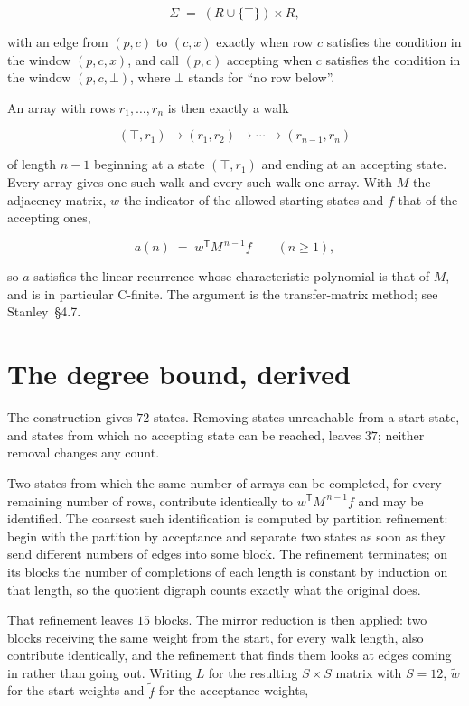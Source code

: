 \documentclass[11pt]{article}
\theoremstyle{definition}
\begin{document}
\[\Sigma \;=\; (R \cup \{\top\}) \times R,\]

with an edge from $(p,c)$ to $(c,x)$ exactly when row $c$ satisfies the condition in the window $(p,c,x)$, and call $(p,c)$ accepting when $c$ satisfies the condition in the window $(p,c,\bot)$, where $\bot$ stands for ``no row below''.

An array with rows $r_1,\dots,r_n$ is then exactly a walk

\[(\top,r_1) \to (r_1,r_2) \to \cdots \to (r_{n-1},r_n)\]

of length $n-1$ beginning at a state $(\top,r_1)$ and ending at an accepting state. Every array gives one such walk and every such walk one array. With $M$ the adjacency matrix, $w$ the indicator of the allowed starting states and $f$ that of the accepting ones,

\[a(n) \;=\; w^{\mathsf T} M^{\,n-1} f \qquad (n \ge 1),\]

so $a$ satisfies the linear recurrence whose characteristic polynomial is that of $M$, and is in particular C-finite. The argument is the transfer-matrix method; see Stanley~\S4.7.

\section{The degree bound, derived}

The construction gives $72$ states. Removing states unreachable from a start state, and states from which no accepting state can be reached, leaves $37$; neither removal changes any count.

Two states from which the same number of arrays can be completed, for every remaining number of rows, contribute identically to $w^{\mathsf T}M^{\,n-1}f$ and may be identified. The coarsest such identification is computed by partition refinement: begin with the partition by acceptance and separate two states as soon as they send different numbers of edges into some block. The refinement terminates; on its blocks the number of completions of each length is constant by induction on that length, so the quotient digraph counts exactly what the original does.

That refinement leaves $15$ blocks. The mirror reduction is then applied: two blocks receiving the same weight from the start, for every walk length, also contribute identically, and the refinement that finds them looks at edges coming in rather than going out. Writing $L$ for the resulting $S \times S$ matrix with $S = 12$, $\tilde w$ for the start weights and $\tilde f$ for the acceptance weights,
\end{document}
